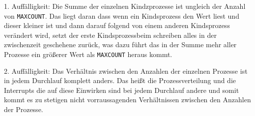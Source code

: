 \documentclass[a4paper,graphics,11pt]{article}
\begin{document}
1. Auffälligkeit:
Die Summe der einzelnen Kindzprozesse ist ungleich der Anzahl von \texttt{MAXCOUNT}. Das liegt daran dass wenn ein Kindsprozess den Wert liest und dieser kleiner ist und dann darauf folgend von einem anderen Kindsprozess verändert wird, setzt der erste Kindsprozessbeim schreiben alles in der zwischenzeit geschehene zurück, was dazu führt das in der Summe mehr aller Prozesse ein größerer Wert als \texttt{MAXCOUNT} heraus kommt.

2. Auffälligkeit:
Das Verhältnis zwischen den Anzahlen der einzelnen Prozesse ist in jedem Durchlauf komplett anders. Das heißt die Prozessverteilung und die Interrupts die auf diese Einwirken sind bei jedem Durchlauf andere und somit kommt es zu stetigen nicht vorraussagenden Verhältnissen zwischen den Anzahlen der Prozesse.
\end{document}
